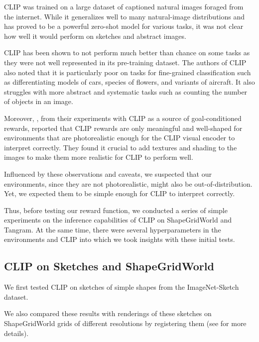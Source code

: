 CLIP was trained on a large dataset of captioned natural images foraged from the internet.
While it generalizes well to many natural-image distributions and has proved to be a powerful zero-shot model for various tasks, it was not clear how well it would perform on sketches and abstract images. 

CLIP has been shown to not perform much better than chance on some tasks as they were not well represented in its pre-training dataset.
The authors of CLIP also noted that it is particularly poor on tasks for fine-grained classification such as differentiating models of cars, species of flowers, and variants of aircraft.
It also struggles with more abstract and systematic tasks such as counting the number of objects in an image.

Moreover, \cite{vlmrm}, from their experiments with CLIP as a source of goal-conditioned rewards, reported that CLIP rewards are only meaningful and well-shaped for environments that are photorealistic enough for the CLIP visual encoder to interpret correctly.
They found it crucial to add textures and shading to the images to make them more realistic for CLIP to perform well.

Influenced by these observations and caveats, we suspected that our environments, since they are not photorealistic, might also be out-of-distribution. 
Yet, we expected them to be simple enough for CLIP to interpret correctly.

Thus, before testing our reward function, we conducted a series of simple experiments on the inference capabilities of CLIP on ShapeGridWorld and Tangram.
At the same time, there were several hyperparameters in the environments and CLIP into which we took insights with these initial tests.

\subsection{CLIP on Sketches and ShapeGridWorld}
\label{sec:clip-sketches}

We first tested CLIP on sketches of simple shapes from the ImageNet-Sketch \cite{imagenet} dataset.

We also compared these results with renderings of these sketches on ShapeGridWorld grids of different resolutions by registering them (see  for more details).

